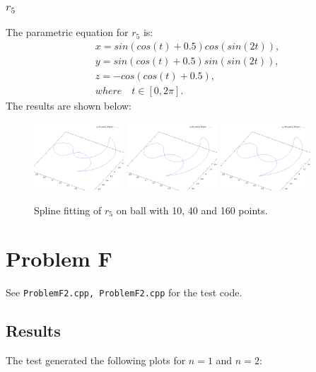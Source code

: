 \documentclass{article}
\begin{document}
\subsubsection{\(r_5\)}
The parametric equation for \(r_5\) is:
\begin{align*}
&x = sin(cos(t) + 0.5)cos(sin(2t)),\\
&y = sin(cos(t) + 0.5)sin(sin(2t)),\\
&z = -cos(cos(t) + 0.5),\\
&where \quad t \in [0, 2\pi].    
\end{align*}
The results are shown below:
\begin{figure}[H]
    \centering
    \includegraphics[width=0.3\textwidth]{../figure/B1r5spline_ball_10.png}
    \includegraphics[width=0.3\textwidth]{../figure/B1r5spline_ball_40.png}
    \includegraphics[width=0.3\textwidth]{../figure/B1r5spline_ball_160.png}
    \caption{Spline fitting of \(r_5\) on ball with 10, 40 and 160 points.}
    \label{fig:ball3}
\end{figure}


\section{Problem F}
See \texttt{ProblemF2.cpp, ProblemF2.cpp} for the test code.
\subsection{Results}

The test generated the following plots for \( n=1 \) and \( n=2 \):
\end{document}
